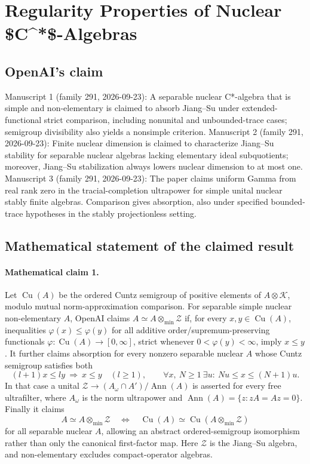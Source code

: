 \documentclass[11pt]{article}
\begin{document}
\section*{Regularity Properties of Nuclear \$C\textasciicircum{}*\$-Algebras}

\subsection{OpenAI's claim}
Manuscript 1 (family 291, 2026-09-23): A separable nuclear C*-algebra that is simple and non-elementary is claimed to absorb Jiang--Su under extended-functional strict comparison, including nonunital and unbounded-trace cases; semigroup divisibility also yields a nonsimple criterion. Manuscript 2 (family 291, 2026-09-23): Finite nuclear dimension is claimed to characterize Jiang--Su stability for separable nuclear algebras lacking elementary ideal subquotients; moreover, Jiang--Su stabilization always lowers nuclear dimension to at most one. Manuscript 3 (family 291, 2026-09-23): The paper claims uniform Gamma from real rank zero in the tracial-completion ultrapower for simple unital nuclear stably finite algebras. Comparison gives absorption, also under specified bounded-trace hypotheses in the stably projectionless setting.

\subsection{Mathematical statement of the claimed result}
\paragraph{Mathematical claim 1.} Let $\operatorname{Cu}(A)$ be the ordered Cuntz semigroup of positive elements of $A\otimes\mathcal K$, modulo mutual norm-approximation comparison. For separable simple nuclear non-elementary $A$, OpenAI claims $A\simeq A\otimes_{\min}\mathcal Z$ if, for every $x,y\in\operatorname{Cu}(A)$, inequalities $\varphi(x)\le\varphi(y)$ for all additive order/supremum-preserving functionals $\varphi:\operatorname{Cu}(A)\to[0,\infty]$, strict whenever $0<\varphi(y)<\infty$, imply $x\le y$.
It further claims absorption for every nonzero separable nuclear $A$ whose Cuntz semigroup satisfies both
\[
(l+1)x\le ly\ \Longrightarrow\ x\le y\quad(l\ge1),\qquad
\forall x,\ N\ge1\ \exists u:\ Nu\le x\le(N+1)u.
\]
In that case a unital $\mathcal Z\to (A_\omega\cap A')/\operatorname{Ann}(A)$ is asserted for every free ultrafilter, where $A_\omega$ is the norm ultrapower and $\operatorname{Ann}(A)=\{z:zA=Az=0\}$. Finally it claims
\[
A\simeq A\otimes_{\min}\mathcal Z\quad\Longleftrightarrow\quad
\operatorname{Cu}(A)\simeq\operatorname{Cu}(A\otimes_{\min}\mathcal Z)
\]
for all separable nuclear $A$, allowing an abstract ordered-semigroup isomorphism rather than only the canonical first-factor map. Here $\mathcal Z$ is the Jiang--Su algebra, and non-elementary excludes compact-operator algebras.
\end{document}
